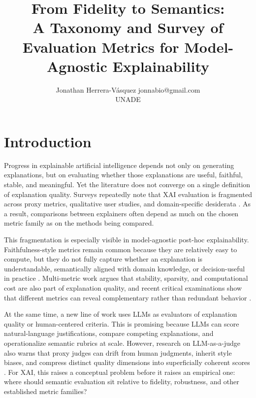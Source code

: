 \documentclass[twoside,11pt]{article}
\begin{document}
\title{From Fidelity to Semantics:\\
A Taxonomy and Survey of Evaluation Metrics for Model-Agnostic Explainability}

\author{
\name Jonathan Herrera-V\'asquez \email jonnabio@gmail.com \\
\addr UNADE
}

\editor{}

\maketitle

\begin{abstract}

\end{abstract}

\begin{keywords}

\end{keywords}

\section{Introduction}

Progress in explainable artificial intelligence depends not only on
generating explanations, but on evaluating whether those explanations
are useful, faithful, stable, and meaningful. Yet the literature does
not converge on a single definition of explanation quality. Surveys
repeatedly note that XAI evaluation is fragmented across proxy metrics,
qualitative user studies, and domain-specific desiderata
\citep{adadi2018xai,arrieta2020xai,kadir2023metrics,canha2025functionally}.
As a result, comparisons between explainers often depend as much on the
chosen metric family as on the methods being compared.

This fragmentation is especially visible in model-agnostic post-hoc
explainability. Faithfulness-style metrics remain common because they
are relatively easy to compute, but they do not fully capture whether an
explanation is understandable, semantically aligned with domain
knowledge, or decision-useful in practice
\citep{ali2023trustworthy,longo2024manifesto}. Multi-metric work argues
that stability, sparsity, and computational cost are also part of
explanation quality, and recent critical examinations show that
different metrics can reveal complementary rather than redundant
behavior \citep{pawlicki2024multiple,zheng2025ffidelity}.

At the same time, a new line of work uses LLMs as evaluators of
explanation quality or human-centered criteria. This is promising
because LLMs can score natural-language justifications, compare
competing explanations, and operationalize semantic rubrics at scale.
However, research on LLM-as-a-judge also warns that proxy judges can
drift from human judgments, inherit style biases, and compress distinct
quality dimensions into superficially coherent scores
\citep{zheng2023judging,gu2024llmjudge,wu2025userperceptions}. For XAI,
this raises a conceptual problem before it raises an empirical one:
where should semantic evaluation sit relative to fidelity, robustness,
and other established metric families?
\end{document}
